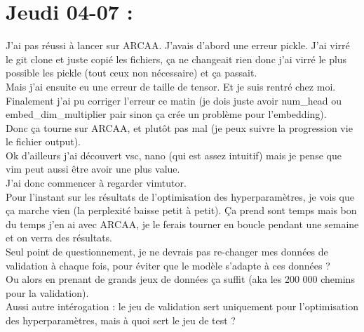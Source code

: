 \documentclass{article}
\begin{document}
\section*{Jeudi 04-07 :}
J'ai pas réussi à lancer sur ARCAA. J'avais d'abord une erreur pickle. J'ai virré le git clone et juste copié les fichiers, ça ne changeait rien donc j'ai virré le plus possible les pickle (tout ceux non nécessaire) et ça passait.\\
Mais j'ai ensuite eu une erreur de taille de tensor. Et je suis rentré chez moi.\\
Finalement j'ai pu corriger l'erreur ce matin (je dois juste avoir num\_head ou embed\_dim\_multiplier pair sinon ça crée un problème pour l'embedding).\\
Donc ça tourne sur ARCAA, et plutôt pas mal (je peux suivre la progression vie le fichier output).\\
Ok d'ailleurs j'ai découvert vsc, nano (qui est assez intuitif) mais je pense que vim peut aussi être avoir une plus value.\\
J'ai donc commencer à regarder vimtutor.\\
Pour l'instant sur les résultats de l'optimisation des hyperparamètres, je vois que ça marche vien (la perplexité baisse petit à petit). Ça prend sont temps mais bon du temps j'en ai avec ARCAA, je le ferais tourner en boucle pendant une semaine et on verra des résultats.\\
Seul point de questionnement, je ne devrais pas re-changer mes données de validation à chaque fois, pour éviter que le modèle s'adapte à ces données ?\\
Ou alors en prenant de grands jeux de données ça suffit (aka les 200 000 chemins pour la validation).\\
Aussi autre intérogation : le jeu de validation sert uniquement pour l'optimisation des hyperparamètres, mais à quoi sert le jeu de test ?\\
\end{document}
